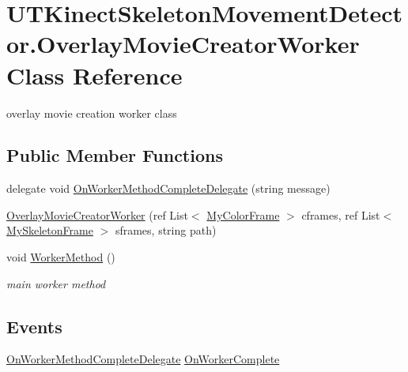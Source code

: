 \hypertarget{class_u_t_kinect_skeleton_movement_detector_1_1_overlay_movie_creator_worker}{\section{U\-T\-Kinect\-Skeleton\-Movement\-Detector.\-Overlay\-Movie\-Creator\-Worker Class Reference}
\label{class_u_t_kinect_skeleton_movement_detector_1_1_overlay_movie_creator_worker}
}


overlay movie creation worker class  


\subsection*{Public Member Functions}
\begin{DoxyCompactItemize}
\item 
delegate void \hyperlink{class_u_t_kinect_skeleton_movement_detector_1_1_overlay_movie_creator_worker_a8f0c6db2f98bfa154472f03a57f57965}{On\-Worker\-Method\-Complete\-Delegate} (string message)
\item 
\hyperlink{class_u_t_kinect_skeleton_movement_detector_1_1_overlay_movie_creator_worker_a3bd9c053c3557b128d9eddfd5661662e}{Overlay\-Movie\-Creator\-Worker} (ref List$<$ \hyperlink{class_u_t_kinect_skeleton_movement_detector_1_1_my_color_frame}{My\-Color\-Frame} $>$ cframes, ref List$<$ \hyperlink{class_u_t_kinect_skeleton_movement_detector_1_1_my_skeleton_frame}{My\-Skeleton\-Frame} $>$ sframes, string path)
\item 
void \hyperlink{class_u_t_kinect_skeleton_movement_detector_1_1_overlay_movie_creator_worker_aebd9b99b693ca67fc6d58e68828899dd}{Worker\-Method} ()
\begin{DoxyCompactList}\small\item\em main worker method \end{DoxyCompactList}\end{DoxyCompactItemize}
\subsection*{Events}
\begin{DoxyCompactItemize}
\item 
\hyperlink{class_u_t_kinect_skeleton_movement_detector_1_1_overlay_movie_creator_worker_a8f0c6db2f98bfa154472f03a57f57965}{On\-Worker\-Method\-Complete\-Delegate} \hyperlink{class_u_t_kinect_skeleton_movement_detector_1_1_overlay_movie_creator_worker_a8287ec8e540ee2d64881ae833d70df20}{On\-Worker\-Complete}
\end{DoxyCompactItemize}


